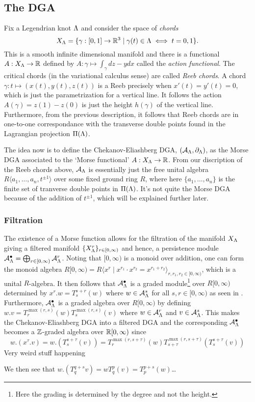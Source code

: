 \documentclass[11pt]{amsart}
\begin{document}
\subsection{The DGA}

Fix a Legendrian knot $\Lambda$ and consider the space of \textit{chords} \[X_\Lambda=\{\gamma:[0,1]\rightarrow \mathbb R^3 \mid \gamma(t)\in \Lambda \iff t=0,1\}.\]
This is a smooth infinite dimensional manifold and there is a functional $A:X_\Lambda\rightarrow \mathbb R$ defined by $A:\gamma \mapsto \int_\gamma dz-ydx$ called the \textit{action functional}. The critical chords (in the variational calculus sense) are called \textit{Reeb chords}. A chord $\gamma:t\mapsto (x(t),y(t),z(t))$ is a Reeb precisely when $x'(t)=y'(t)=0$, which is just the parametrization for a vertical line. It follows the action $A(\gamma)=z(1)-z(0)$ is just the height $h(\gamma)$ of the vertical line. Furthermore, from the previous description, it follows that Reeb chords are in one-to-one correspondance with the transverse double points found in the Lagrangian projection $\Pi(\Lambda)$.

The idea now is to define the Chekanov-Eliashberg DGA, $(\mathcal{A}_{\Lambda},\partial_\Lambda)$, as the Morse DGA associated to the `Morse functional' $A:X_\Lambda\rightarrow \mathbb R$. From our discription of the Reeb chords above, $\mathcal{A}_{\Lambda}$ is essentially just the free unital algebra $R\langle a_1,\ldots,a_n,t^{\pm1}\rangle$ over some fixed ground ring $R$, where here $\{a_1,\ldots,a_n\}$ is the finite set of tranverse double points in $\Pi(\Lambda)$. It's not quite the Morse DGA because of the addition of $t^{\pm1}$, which will be explained further later.

\subsubsection{Filtration}

The existence of a Morse function allows for the filtration of the manifold $X_\Lambda$ giving a filtered manifold $\{X^r_\Lambda\}_{r\in[0,\infty)}$ and hence, a persistence module $\mathcal{A}_{\Lambda}^\bullet=\bigoplus_{r\in[0,\infty)} \mathcal{A}_{\Lambda}^r$. Noting that $[0,\infty)$ is a monoid over addition, one can form the monoid algebra $R[0,\infty)=R\langle x^r \mid x^{r_1} \cdot x^{r_2} = x^{r_1+r_2} \rangle_{r,r_1,r_2\in [0,\infty)}$, which is a unital $R$-algebra. It then follows that $\mathcal{A}_{\Lambda}^\bullet$ is a graded module\footnote{Here the grading is determined by the degree and not the height.} over $R[0,\infty)$ determined by $x^r.w=T_{s}^{s+r}(w)$ 
where $w\in \mathcal{A}_{\Lambda}^s$ for all $s,r\in [0,\infty)$ as seen in \cite{ZC04pers}. Furthermore, $\mathcal{A}_{\Lambda}^\bullet$ is a graded algebra over $R[0,\infty)$ by defining $w.v=T_r^{\max(r,s)}(w)T_s^{\max(r,s)}(v)$ where $w\in \mathcal{A}_{\Lambda}^r$ and $v\in \mathcal{A}_{\Lambda}^s$. This makes the Chekanov-Eliashberg DGA into a filtered DGA and the corresponding $\mathcal{A}_{\Lambda}^\bullet$ becomes a $\mathbb Z$-graded algebra over $\mathbb R[0,\infty)$ since \[w.(x^\tau. v)=w.(T_s^{s+\tau}(v))=T_r^{\max(r,s+\tau)}(w)T_{s+\tau}^{\max(r,s+\tau)}(T_s^{s+\tau}(v))\]Very weird stuff happening

We then see that $w.(T_{q}^{q+s} v) = w T_{q}^{p}(v)=T_p^{p+s}(w)$\ldots



\newpage
\printbibliography
\end{document}
